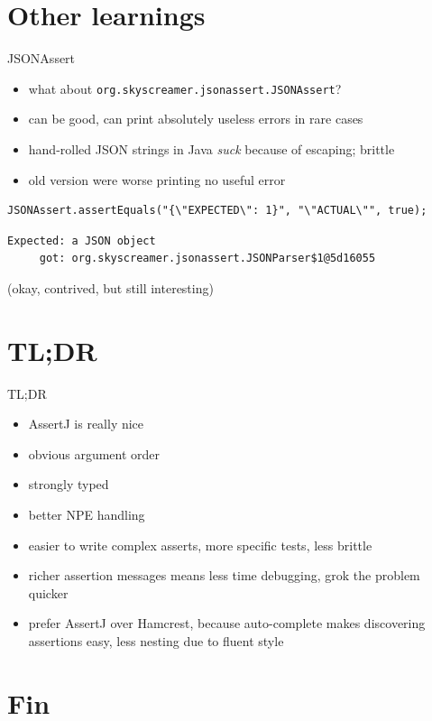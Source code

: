 \documentclass[xetex,12pt,aspectratio=169]{beamer}
\begin{document}
\section{Other learnings}


\begin{frame}[fragile]{JSONAssert}
\begin{itemize}
\item what about \texttt{org.skyscreamer.jsonassert.JSONAssert}?
\item can be good, can print absolutely useless errors in rare cases
\item hand-rolled JSON strings in Java \textit{suck} because of escaping; brittle
\item old version were worse printing no useful error
\end{itemize}
\pause
\vfill
\begin{verbatim}
JSONAssert.assertEquals("{\"EXPECTED\": 1}", "\"ACTUAL\"", true);
\end{verbatim}
\begin{verbatim}
Expected: a JSON object
     got: org.skyscreamer.jsonassert.JSONParser$1@5d16055
\end{verbatim}
(okay, contrived, but still interesting)
\end{frame}


\section{TL;DR}


\begin{frame}[fragile]{TL;DR}
\begin{itemize}
\item AssertJ is really nice
\item obvious argument order
\item strongly typed
\item better NPE handling
\item easier to write complex asserts, more specific tests, less brittle
\item richer assertion messages means less time debugging, grok the problem quicker
\item prefer AssertJ over Hamcrest, because auto-complete makes discovering assertions easy, less nesting due to fluent style
\end{itemize}
\end{frame}


\section{Fin}
\end{document}
